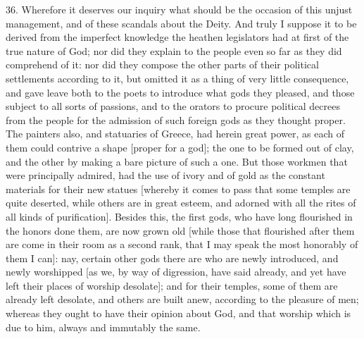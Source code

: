36. Wherefore it deserves our inquiry what should be the occasion of this
unjust management, and of these scandals about the Deity. And truly I
suppose it to be derived from the imperfect knowledge the heathen
legislators had at first of the true nature of God; nor did they explain
to the people even so far as they did comprehend of it: nor did they
compose the other parts of their political settlements according to it,
but omitted it as a thing of very little consequence, and gave leave both
to the poets to introduce what gods they pleased, and those subject to all
sorts of passions, and to the orators to procure political decrees from
the people for the admission of such foreign gods as they thought proper.
The painters also, and statuaries of Greece, had herein great power, as
each of them could contrive a shape [proper for a god]; the one to be
formed out of clay, and the other by making a bare picture of such a one.
But those workmen that were principally admired, had the use of ivory and
of gold as the constant materials for their new statues [whereby it comes
to pass that some temples are quite deserted, while others are in great
esteem, and adorned with all the rites of all kinds of purification].
Besides this, the first gods, who have long flourished in the honors done
them, are now grown old [while those that flourished after them are come
in their room as a second rank, that I may speak the most honorably of
them I can]: nay, certain other gods there are who are newly introduced,
and newly worshipped [as we, by way of digression, have said already, and
yet have left their places of worship desolate]; and for their temples,
some of them are already left desolate, and others are built anew,
according to the pleasure of men; whereas they ought to have their opinion
about God, and that worship which is due to him, always and immutably the
same.

